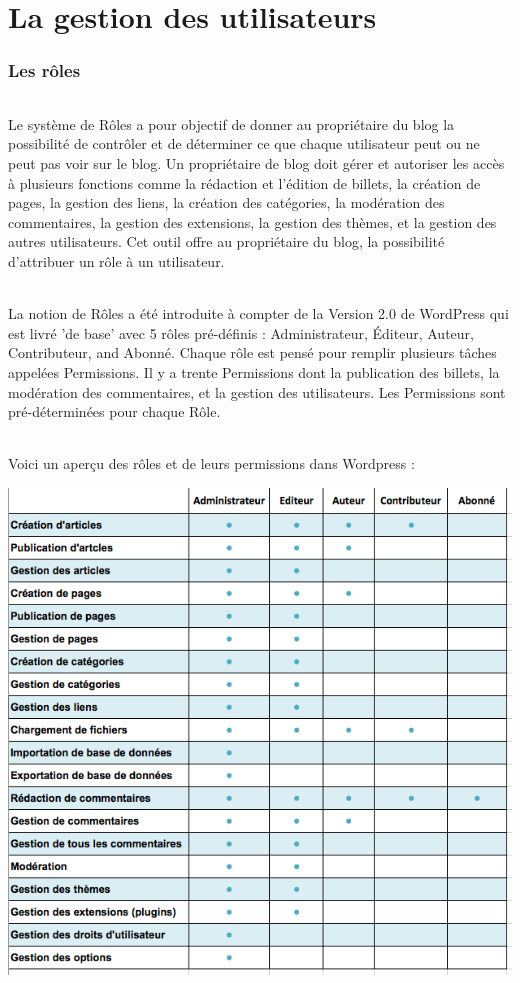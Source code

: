 \documentclass[10pt,a4paper]{article}
\begin{document}
\part{La gestion des utilisateurs}
\newpage
\section{Les rôles}
\paragraph{}Le système de Rôles a pour objectif de donner au propriétaire du blog la possibilité de contrôler et de déterminer ce que chaque utilisateur peut ou ne peut pas voir sur le blog. Un propriétaire de blog doit gérer et autoriser les accès à plusieurs fonctions comme la rédaction et l'édition de billets, la création de pages, la gestion des liens, la création des catégories, la modération des commentaires, la gestion des extensions, la gestion des thèmes, et la gestion des autres utilisateurs. Cet outil offre au propriétaire du blog, la possibilité d'attribuer un rôle à un utilisateur. 
\paragraph{}La notion de Rôles a été introduite à compter de la Version 2.0 de WordPress qui est livré 'de base' avec 5 rôles pré-définis : Administrateur, Éditeur, Auteur, Contributeur, and Abonné. Chaque rôle est pensé pour remplir plusieurs tâches appelées Permissions. Il y a trente Permissions dont la publication des billets, la modération des commentaires, et la gestion des utilisateurs. Les Permissions sont pré-déterminées pour chaque Rôle.
\paragraph{}Voici un aperçu des rôles et de leurs permissions dans Wordpress :
\begin{center}
\includegraphics[scale=0.5]{img/0156.png}
\end{center}
\newpage
\end{document}
